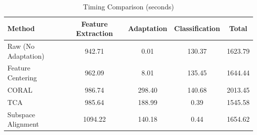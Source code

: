 \begin{table}[htbp]
\centering
\caption{Timing Comparison (seconds)}
\label{tab:timing}
\begin{tabular}{lcccc}
\toprule
Method & Feature Extraction & Adaptation & Classification & Total \\
\midrule
Raw (No Adaptation) & 942.71 & 0.01 & 130.37 & 1623.79 \\
Feature Centering & 962.09 & 8.01 & 135.45 & 1644.44 \\
CORAL & 986.74 & 298.40 & 140.68 & 2013.45 \\
TCA & 985.64 & 188.99 & 0.39 & 1545.58 \\
Subspace Alignment & 1094.22 & 140.18 & 0.44 & 1654.62 \\
\bottomrule
\end{tabular}
\end{table}
